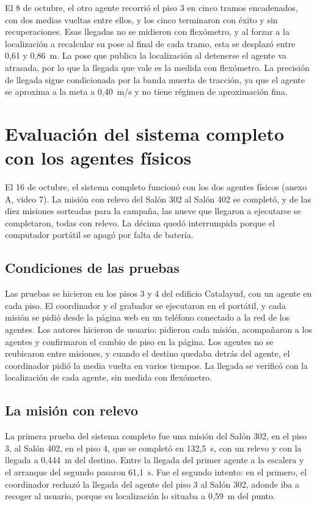 El 8 de octubre, el otro agente recorrió el piso 3 en cinco tramos encadenados, con dos medias vueltas entre ellos, y los cinco terminaron con éxito y sin recuperaciones. Esas llegadas no se midieron con flexómetro, y al forzar a la localización a recalcular su pose al final de cada tramo, esta se desplazó entre 0,61 y 0,86~m. La pose que publica la localización al detenerse el agente va atrasada, por lo que la llegada que vale es la medida con flexómetro. La precisión de llegada sigue condicionada por la banda muerta de tracción, ya que el agente se aproxima a la meta a 0,40~m/s y no tiene régimen de aproximación fina.

\section{Evaluación del sistema completo con los agentes físicos}
\label{sec:res-completo}

El 16 de octubre, el sistema completo funcionó con los dos agentes físicos (anexo A, video 7). La misión con relevo del Salón 302 al Salón 402 se completó, y de las diez misiones sorteadas para la campaña, las nueve que llegaron a ejecutarse se completaron, todas con relevo. La décima quedó interrumpida porque el computador portátil se apagó por falta de batería.

\subsection{Condiciones de las pruebas}

Las pruebas se hicieron en los pisos 3 y 4 del edificio Catalayud, con un agente en cada piso. El coordinador y el grabador se ejecutaron en el portátil, y cada misión se pidió desde la página web en un teléfono conectado a la red de los agentes. Los autores hicieron de usuario: pidieron cada misión, acompañaron a los agentes y confirmaron el cambio de piso en la página. Los agentes no se reubicaron entre misiones, y cuando el destino quedaba detrás del agente, el coordinador pidió la media vuelta en varios tiempos. La llegada se verificó con la localización de cada agente, sin medida con flexómetro.

\subsection{La misión con relevo}

La primera prueba del sistema completo fue una misión del Salón 302, en el piso 3, al Salón 402, en el piso 4, que se completó en 132,5~s, con un relevo y con la llegada a 0,444~m del destino. Entre la llegada del primer agente a la escalera y el arranque del segundo pasaron 61,1~s. Fue el segundo intento: en el primero, el coordinador rechazó la llegada del agente del piso 3 al Salón 302, adonde iba a recoger al usuario, porque su localización lo situaba a 0,59~m del punto.

